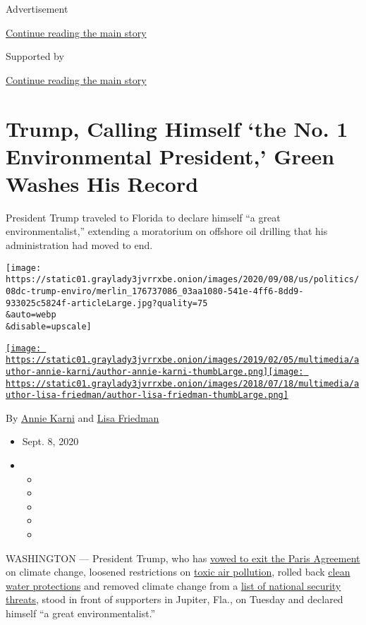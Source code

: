 Advertisement

\protect\hyperlink{after-top}{Continue reading the main story}

Supported by

\protect\hyperlink{after-sponsor}{Continue reading the main story}

\hypertarget{trump-calling-himself-the-no-1-environmental-president-green-washes-his-record}{%
\section{Trump, Calling Himself `the No. 1 Environmental President,'
Green Washes His
Record}\label{trump-calling-himself-the-no-1-environmental-president-green-washes-his-record}}

President Trump traveled to Florida to declare himself ``a great
environmentalist,'' extending a moratorium on offshore oil drilling that
his administration had moved to end.

\texttt{[image: https://static01.graylady3jvrrxbe.onion/images/2020/09/08/us/politics/08dc-trump-enviro/merlin\_176737086\_03aa1080-541e-4ff6-8dd9-933025c5824f-articleLarge.jpg?quality=75\\\&auto=webp\\\&disable=upscale]}

\href{https://www.nytimes3xbfgragh.onion/by/annie-karni}{\texttt{[image: https://static01.graylady3jvrrxbe.onion/images/2019/02/05/multimedia/author-annie-karni/author-annie-karni-thumbLarge.png]}}\href{https://www.nytimes3xbfgragh.onion/by/lisa-friedman}{\texttt{[image: https://static01.graylady3jvrrxbe.onion/images/2018/07/18/multimedia/author-lisa-friedman/author-lisa-friedman-thumbLarge.png]}}

By \href{https://www.nytimes3xbfgragh.onion/by/annie-karni}{Annie Karni}
and \href{https://www.nytimes3xbfgragh.onion/by/lisa-friedman}{Lisa
Friedman}

\begin{itemize}
\item
  Sept. 8, 2020
\item
  \begin{itemize}
  \item
  \item
  \item
  \item
  \item
  \end{itemize}
\end{itemize}

WASHINGTON --- President Trump, who has
\href{https://www.nytimes3xbfgragh.onion/2019/11/04/climate/trump-paris-agreement-climate.html}{vowed
to exit the Paris Agreement} on climate change, loosened restrictions on
\href{https://www.nytimes3xbfgragh.onion/2020/06/04/climate/trump-environment-coronavirus.html}{toxic
air pollution}, rolled back
\href{https://www.nytimes3xbfgragh.onion/2020/01/22/climate/trump-environment-water.html}{clean
water protections} and removed climate change from a
\href{https://www.nytimes3xbfgragh.onion/2019/07/30/opinion/trump-climate-change.html}{list
of national security threats}, stood in front of supporters in Jupiter,
Fla., on Tuesday and declared himself ``a great environmentalist.''

